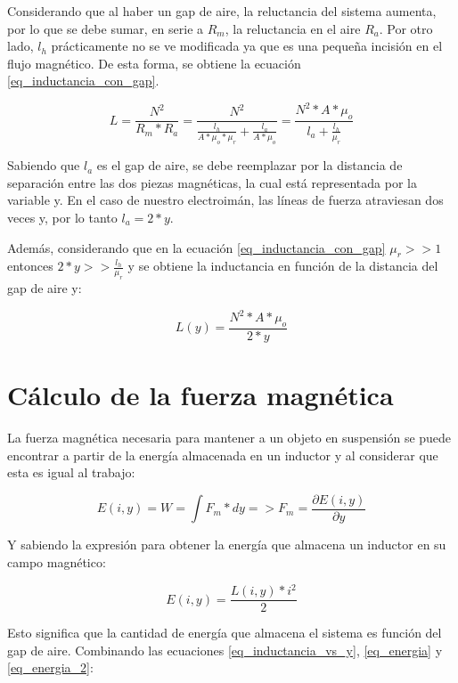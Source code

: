 \noindent Considerando que al haber un gap de aire, la reluctancia del sistema aumenta, por lo que se debe sumar, en serie a $R_{m}$, la reluctancia en el aire $R_{a}$. Por otro lado, $l_{h}$ prácticamente no se ve modificada ya que es una pequeña incisión en el flujo magnético. De esta forma, se obtiene la ecuación \ref{eq_inductancia_con_gap}.

\begin{equation}\label{eq_inductancia_con_gap}
L=\frac{N^{2}}{R_{m}*R_{a}}=\frac{N^{2}}{\frac{l_{h}}{A*\mu_{o}*\mu_{r}}+\frac{l_{a}}{A*\mu_{o}}}=\frac{N^{2}*A*\mu_{o}}{l_{a}+\frac{l_{h}}{\mu_{r}}}
\end{equation}

\noindent Sabiendo que $l_{a}$ es el gap de aire, se debe reemplazar por la distancia de separación entre las dos piezas magnéticas, la cual está representada por la variable y. En el caso de nuestro electroimán, las líneas de fuerza atraviesan dos veces y, por lo tanto $l_{a}=2*y$.

\noindent Además, considerando que en la ecuación \ref{eq_inductancia_con_gap} $\mu_{r}>>1$ entonces $2*y>>\frac{l_{h}}{\mu_{r}}$ y se obtiene la inductancia en función de la distancia del gap de aire y:

\begin{equation}\label{eq_inductancia_vs_y}
		L(y)=\frac{{N^{2}*A*\mu_{o}}}{2*y}
\end{equation}

\section{Cálculo de la fuerza magnética}

\noindent La fuerza magnética necesaria para mantener a un objeto en suspensión se puede encontrar a partir de la energía almacenada en un inductor y al considerar que esta es  igual al trabajo:

\begin{equation}\label{eq_energia}
	E(i,y)=W=\int{F_{m}*dy}=>F_{m}=\frac{\partial{E(i,y)}}{\partial{y}}
\end{equation}

\noindent Y sabiendo la expresión para obtener la energía que almacena un inductor en su campo magnético:

\begin{equation}\label{eq_energia_2}
	E(i,y)=\frac{L(i,y)*i^{2}}{2}
\end{equation}

\noindent Esto significa que la cantidad de energía que almacena el sistema es función del gap de aire. Combinando las ecuaciones \ref{eq_inductancia_vs_y}, \ref{eq_energia} y \ref{eq_energia_2}:

